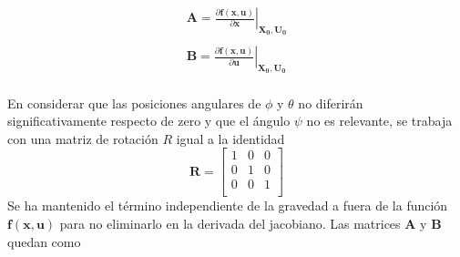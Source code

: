 \documentclass[twoside,11pt]{book}
\begin{document}
\begin{equation}
\begin{array}{c}
\pmb{A}=\left.{\frac{\partial \pmb{f(x,u)}}{\partial \pmb{x}}}\right\vert_{\pmb{X_0},\pmb{U_0}} \\ %
\\
\pmb{B}=\left.{\frac{\partial \pmb{f(x,u)}}{\partial \pmb{u}}}\right\vert_{\pmb{X_0},\pmb{U_0}} \\\end{array}
\label{jacobians}
\end{equation}

En considerar que las posiciones angulares de $\phi$ y $\theta$ no diferirán significativamente respecto de zero y que el ángulo $\psi$ no es relevante, se trabaja con una matriz de rotación $R$ igual a la identidad
\begin{equation}
\pmb{R}=\left[\begin{array}{ccc}
1 & 0 & 0 \\
0 & 1 & 0 \\
0 & 0 & 1 \\ \end{array} \right]
\end{equation}
Se ha mantenido el término independiente de la gravedad a fuera de la función $\pmb{f(x,u)}$ para no eliminarlo en la derivada del jacobiano. Las matrices $\pmb{A}$ y $\pmb{B}$ quedan como
\end{document}
